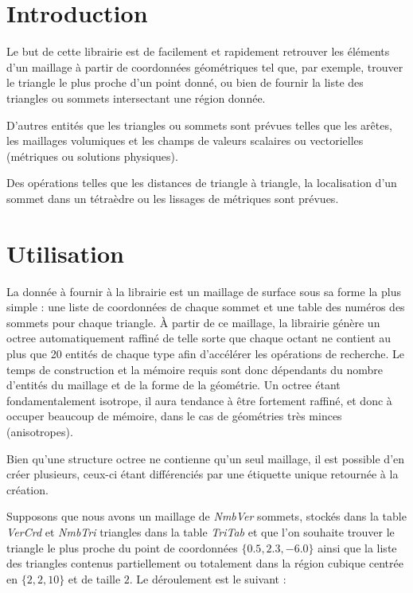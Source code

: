 \documentclass[a4paper,12pt]{article}
\begin{document}
\section{Introduction}
Le but de cette librairie est de facilement et rapidement retrouver les éléments d'un maillage à partir de coordonnées géométriques tel que, par exemple, trouver le triangle le plus proche d'un point donné, ou bien de fournir la liste des triangles ou sommets intersectant une région donnée.

D'autres entités que les triangles ou sommets sont prévues telles que les arêtes, les maillages volumiques et les champs de valeurs scalaires ou vectorielles (métriques ou solutions physiques).

Des opérations telles que les distances de triangle à triangle, la localisation d'un sommet dans un tétraèdre ou les lissages de métriques sont prévues.



%
%

\section{Utilisation}
La donnée à fournir à la librairie est un maillage de surface sous sa forme la plus simple : une liste de coordonnées de chaque sommet et une table des numéros des sommets pour chaque triangle. À partir de ce maillage, la librairie génère un octree automatiquement raffiné de telle sorte que chaque octant ne contient au plus que 20 entités de chaque type afin d'accélérer les opérations de recherche. Le temps de construction et la mémoire requis sont donc dépendants du nombre d'entités du maillage et de la forme de la géométrie. Un octree étant fondamentalement isotrope, il aura tendance à être fortement raffiné, et donc à occuper beaucoup de mémoire, dans le cas de géométries très minces (anisotropes).

Bien qu'une structure octree ne contienne qu'un seul maillage, il est possible d'en créer plusieurs, ceux-ci étant différenciés par une étiquette unique retournée à la création.

Supposons que nous avons un maillage de \emph{NmbVer} sommets, stockés dans la table \emph{VerCrd} et \emph{NmbTri} triangles dans la table \emph{TriTab} et que l'on souhaite trouver le triangle le plus proche du point de coordonnées $\{0.5, 2.3, -6.0\}$ ainsi que la liste des triangles contenus partiellement ou totalement dans la région cubique centrée en $\{2,2,10\}$ et de taille $2$. Le déroulement est le suivant :
\end{document}

